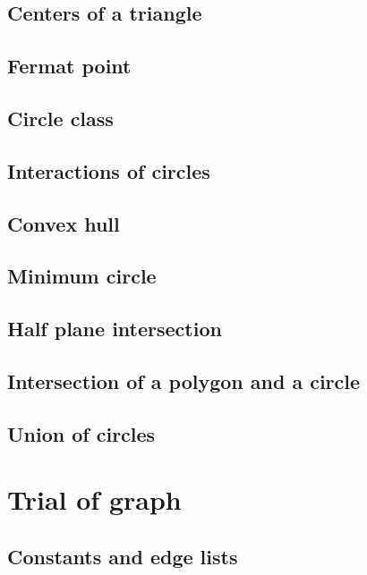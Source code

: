 \documentclass[UTF8,a4paper]{report}
\begin{document}
		\section{Centers of a triangle}
			
		\section{Fermat point}
			
		\section{Circle class}
			
		\section{Interactions of circles}
			
		\section{Convex hull}
			
		\section{Minimum circle}
			
		\section{Half plane intersection}
			
		\section{Intersection of a polygon and a circle}
			
		\section{Union of circles}	
			
	\chapter{Trial of graph}
		\section{Constants and edge lists}
			
\end{document}

